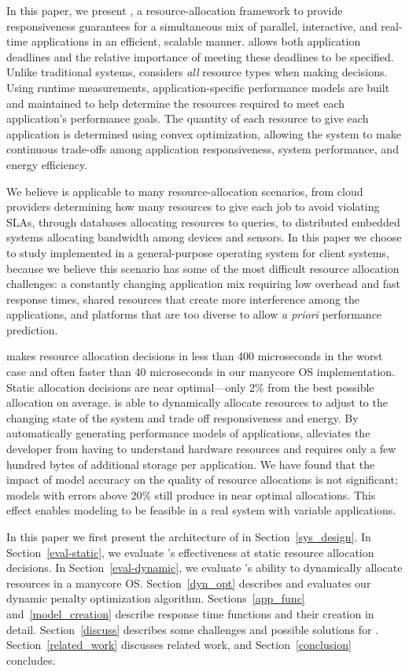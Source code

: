 In this paper, we present \pacora, a resource-allocation framework to
provide responsiveness guarantees for a simultaneous mix of parallel,
interactive, and real-time applications in an efficient, scalable
manner.  \pacora allows both application deadlines and the relative
importance of meeting these deadlines to be specified.  Unlike
traditional systems, \pacora considers \emph{all} resource types when
making decisions.  Using runtime measurements, application-specific
performance models are built and maintained to help determine the
resources required to meet each application's performance goals.  The
quantity of each resource to give each application is determined using
convex optimization, allowing the system to make continuous trade-offs
among application responsiveness, system performance, and energy
efficiency.

We believe \pacora is applicable to many resource-allocation
scenarios, from cloud providers determining how many resources to give
each job to avoid violating SLAs, through databases allocating
resources to queries, to distributed embedded systems allocating
bandwidth among devices and sensors.  In this paper we choose to study
\pacora implemented in a general-purpose operating system for client
systems, because we believe this scenario has some of the most
difficult resource allocation challenges: a constantly changing
application mix requiring low overhead and fast response times, shared
resources that create more interference among the applications, and
platforms that are too diverse to allow \emph{a priori} performance
prediction.

\pacora makes resource allocation decisions in less than 400
microseconds in the worst case and often faster than 40 microseconds
in our manycore OS implementation.  Static allocation decisions are
near optimal---only 2\% from the best possible allocation on average.
\pacora is able to dynamically allocate resources to adjust to the
changing state of the system and trade off responsiveness and
energy. By automatically generating performance models of
applications, \pacora alleviates the developer from having to
understand hardware resources and requires only a few hundred bytes of
additional storage per application.  We have found that the impact of model accuracy on the quality of resource allocations is not significant; models with errors above 20\% still produce in near optimal allocations.  This effect enables modeling to be feasible in a real system with variable applications.

In this paper we first present the architecture of \pacora in Section~\ref{sys_design}.  In Section~\ref{eval-static}, we evaluate \pacora's effectiveness at static resource allocation decisions. In Section~\ref{eval-dynamic}, we evaluate \pacora's ability to dynamically allocate resources in a manycore OS.  Section~\ref{dyn_opt} describes and evaluates our dynamic penalty optimization algorithm. Sections~\ref{app_func} and~\ref{model_creation} describe response time functions and their creation in detail.  Section~\ref{discuss} describes some challenges and possible solutions for \pacora. Section~\ref{related_work} discusses related work, and Section~\ref{conclusion} concludes.

